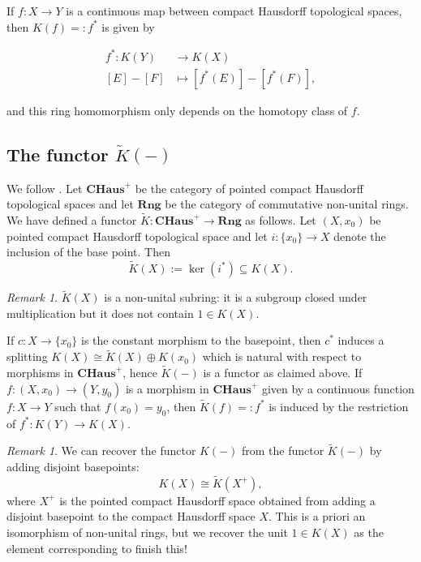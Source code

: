 \documentclass[12pt,a4paper]{amsart}
\theoremstyle{plain}
\theoremstyle{definition}
\theoremstyle{remark}
\newtheorem{rem}[thm]{Remark}
\begin{document}
If $f \colon X \to Y$ is a continuous map between compact Hausdorff topological spaces, then $K(f) =: f^{*}$ is given by

\begin{align*}
  f^{*} \colon K(Y) & \to K(X) \\
  [E] - [F] & \mapsto [f^{*}(E)] - [f^{*}(F)],
\end{align*}

and this ring homomorphism only depends on the homotopy class of $f$.

\subsection{The functor $\tilde{K}(-)$}
We follow \cite[p.~66]{ati67}.
Let $\mathbf{CHaus}^{+}$ be the category of pointed compact Hausdorff topological spaces and let $\mathbf{Rng}$ be the category of commutative non-unital rings.
We have defined a functor $\tilde{K} \colon \mathbf{CHaus}^{+} \to \mathbf{Rng}$ as follows.
Let $(X,x_{0})$ be pointed compact Hausdorff topological space and let $i \colon \{ x_{0} \} \to X$ denote the inclusion of the base point.
Then
\[ \tilde{K}(X) := \ker(i^{*}) \subseteq K(X). \]

\begin{rem}
  $\tilde{K}(X)$ is a non-unital subring: it is a subgroup closed under multiplication but it does not contain $1 \in K(X)$.
\end{rem}

If $c \colon X \to \{ x_{0} \}$ is the constant morphism to the basepoint, then $c^{*}$ induces a splitting $K(X) \cong \tilde{K}(X) \oplus K(x_{0})$ which is natural with respect to morphisms in $\mathbf{CHaus}^{+}$, hence $\tilde{K}(-)$ is a functor as claimed above.
If $f \colon (X,x_{0}) \to (Y,y_{0})$ is a morphism in $\mathbf{CHaus}^{+}$ given by a continuous function $f \colon X \to Y$ such that $f(x_{0}) = y_{0}$, then $\tilde{K}(f) =: f^{*}$ is induced by the restriction of $f^{*} \colon K(Y) \to K(X)$.

\begin{rem}
  We can recover the functor $K(-)$ from the functor $\tilde{K}(-)$ by adding disjoint basepoints:
  \[ K(X) \cong \tilde{K}(X^{+}), \]
  where $X^{+}$ is the pointed compact Hausdorff space obtained from adding a disjoint basepoint to the compact Hausdorff space $X$.
  This is a priori an isomorphism of non-unital rings, but we recover the unit $1 \in K(X)$ as the element corresponding to \color{red} finish this! \color{black}
\end{rem}
\end{document}
